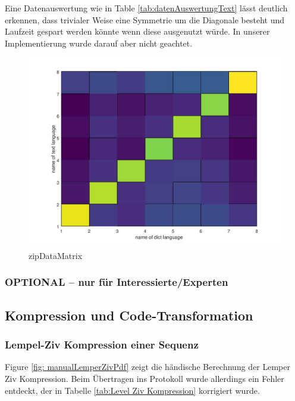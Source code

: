 \documentclass[12pt,german]{article}
\begin{document}
Eine Datenauswertung wie in Table \ref{tab:datenAuswertungText} lässt deutlich erkennen, dass trivialer Weise eine Symmetrie um die Diagonale besteht und Laufzeit gespart werden könnte wenn diese ausgenutzt würde. In unserer Implementierung wurde darauf aber nicht geachtet. 


\begin{figure}[H]
	\centering
	\includegraphics[width=12cm]{images/resultZipData.jpg}
	\caption{zipDataMatrix}
	\label{fig: zipDataMatrix}
\end{figure}

\newpage

\label{fig: calculateMatrixOctaveCode}


\subsubsection{OPTIONAL – nur für Interessierte/Experten}


\subsection{Kompression und Code-Transformation}
\subsubsection{Lempel-Ziv Kompression einer Sequenz}
Figure \ref{fig: manualLemperZivPdf} zeigt die händische Berechnung der Lemper Ziv Kompression. Beim Übertragen ins Protokoll wurde allerdings ein Fehler entdeckt, der in Tabelle \ref{tab:Level Ziv Kompression} korrigiert wurde.
\end{document}
